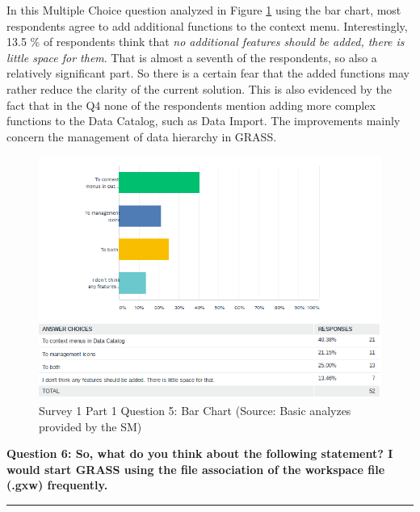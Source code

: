 \documentclass[a4paper,10pt,twoside]{article}
\begin{document}
\noindent In this Multiple Choice question analyzed in Figure \ref{fig:survey1_part1_question5_descriptive_stats_sm} using the bar chart, most respondents agree to add additional functions to the context menu. Interestingly, 13.5 \% of respondents think that \textit{no additional features should be added, there is little space for them}. That is almost a seventh of the respondents, so also a relatively significant part. So there is a certain fear that the added functions may rather reduce the clarity of the current solution. This is also evidenced by the fact that in the Q4 none of the respondents mention adding more complex functions to the Data Catalog, such as Data Import. The improvements mainly concern the management of data hierarchy in GRASS.

\vspace{0.3cm}
\begin{figure}[hbt!] 
\begin{center}
\includegraphics[width=17cm]{../surveys/analyzed_data/survey1_part1_question5_descriptive_stats_sm.png} 
\caption[Survey 1 Part 1 Question 5: Bar Chart]{Survey 1 Part 1 Question 5: Bar Chart (Source: Basic analyzes provided by the SM)}
\label{fig:survey1_part1_question5_descriptive_stats_sm}
\end{center}
\end{figure}

\newpage
\noindent \textbf{Question 6: So, what do you think about the following statement? I would start GRASS using the file association of the workspace file (.gxw) frequently.}
\par\noindent\rule{\textwidth}{0.4pt}
\end{document}
